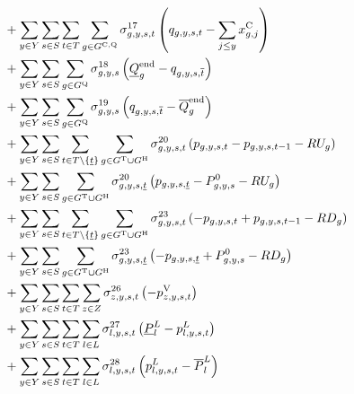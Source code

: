 \documentclass{article}
\begin{document}
\begin{align}
	& + \sum\limits_{\iYear \in \sYears}\sum\limits_{\iScenario \in \sScenarios}\sum\limits_{\iInterval \in \sIntervals} \sum\limits_{\iGenerator \in \sStorageCandidate} \dMaxStorageEnergyCandidate \left(\vStorageUnitEnergy - \sum\limits_{\iYearAlias \leq \iYear} \vInstalledCapacity[\iGenerator,\iYearAlias]\right)\nonumber\\
	& + \sum\limits_{\iYear \in \sYears}\sum\limits_{\iScenario \in \sScenarios} \sum\limits_{\iGenerator \in \sStorage} \dMinStorageEnergyIntervalEnd \left(\cStorageUnitEnergyIntervalEndMin - \vStorageUnitEnergy[\iGenerator,\iYear,\iScenario,\iIntervalTerminal]\right)\nonumber\\
	& + \sum\limits_{\iYear \in \sYears}\sum\limits_{\iScenario \in \sScenarios} \sum\limits_{\iGenerator \in \sStorage} \dMaxStorageEnergyIntervalEnd \left(\vStorageUnitEnergy[\iGenerator,\iYear,\iScenario,\iIntervalTerminal] - \cStorageUnitEnergyIntervalEndMax\right)\nonumber\\
	& + \sum\limits_{\iYear \in \sYears}\sum\limits_{\iScenario \in \sScenarios}\sum\limits_{\iInterval \in \sIntervals \setminus \{\iIntervalStart\}} \sum\limits_{\iGenerator \in \sGeneratorsThermal \cup \sGeneratorsHydro} \dRampRateUp \left(\vPower - \vPower[\iGenerator,\iYear,\iScenario,\iInterval-1] - \cRampRateUp\right)\nonumber\\
	& + \sum\limits_{\iYear \in \sYears}\sum\limits_{\iScenario \in \sScenarios} \sum\limits_{\iGenerator \in \sGeneratorsThermal \cup \sGeneratorsHydro} \dRampRateUp[\iGenerator,\iYear,\iScenario,\iIntervalStart] \left(\vPower[\iGenerator,\iYear,\iScenario,\iIntervalStart] - \cPowerInitial - \cRampRateUp\right)\nonumber\\
	& + \sum\limits_{\iYear \in \sYears}\sum\limits_{\iScenario \in \sScenarios}\sum\limits_{\iInterval \in \sIntervals \setminus \{\iIntervalStart\}} \sum\limits_{\iGenerator \in \sGeneratorsThermal \cup \sGeneratorsHydro} \dRampRateDown \left(- \vPower + \vPower[\iGenerator,\iYear,\iScenario,\iInterval-1] - \cRampRateDown\right)\nonumber\\
	& + \sum\limits_{\iYear \in \sYears}\sum\limits_{\iScenario \in \sScenarios} \sum\limits_{\iGenerator \in \sGeneratorsThermal \cup \sGeneratorsHydro} \dRampRateDown[\iGenerator,\iYear,\iScenario,\iIntervalStart] \left(- \vPower[\iGenerator,\iYear,\iScenario,\iIntervalStart] + \cPowerInitial - \cRampRateDown\right)\nonumber\\
	& + \sum\limits_{\iYear \in \sYears}\sum\limits_{\iScenario \in \sScenarios}\sum\limits_{\iInterval \in \sIntervals} \sum\limits_{\iZone \in \sZones} \dNonNegativeLostLoad \left(- \vLostLoadPower\right)\nonumber\\
	& + \sum\limits_{\iYear \in \sYears}\sum\limits_{\iScenario \in \sScenarios}\sum\limits_{\iInterval \in \sIntervals} \sum\limits_{\iLink \in \sLinks} \dMinPowerFlow \left(\cPowerFlowMin - \vPowerFlow\right)\nonumber\\
	& + \sum\limits_{\iYear \in \sYears}\sum\limits_{\iScenario \in \sScenarios}\sum\limits_{\iInterval \in \sIntervals} \sum\limits_{\iLink \in \sLinks} \dMaxPowerFlow \left(\vPowerFlow - \cPowerFlowMax\right) \\\nonumber
\end{align}
\end{document}
